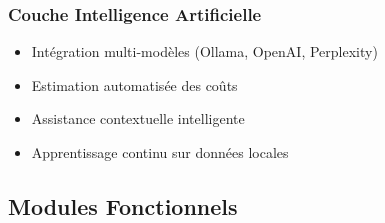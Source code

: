 \subsubsection{Couche Intelligence Artificielle}
\begin{itemize}
    \item Intégration multi-modèles (Ollama, OpenAI, Perplexity)
    \item Estimation automatisée des coûts
    \item Assistance contextuelle intelligente
    \item Apprentissage continu sur données locales
\end{itemize}

\subsection{Modules Fonctionnels}

